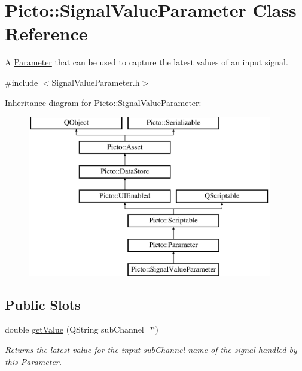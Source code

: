 \hypertarget{class_picto_1_1_signal_value_parameter}{\section{Picto\-:\-:Signal\-Value\-Parameter Class Reference}
\label{class_picto_1_1_signal_value_parameter}
}


A \hyperlink{class_picto_1_1_parameter}{Parameter} that can be used to capture the latest values of an input signal.  




{\ttfamily \#include $<$Signal\-Value\-Parameter.\-h$>$}

Inheritance diagram for Picto\-:\-:Signal\-Value\-Parameter\-:\begin{figure}[H]
\begin{center}
\leavevmode
\includegraphics[height=7.000000cm]{class_picto_1_1_signal_value_parameter}
\end{center}
\end{figure}
\subsection*{Public Slots}
\begin{DoxyCompactItemize}
\item 
\hypertarget{class_picto_1_1_signal_value_parameter_a91b58a4c687a68375c05d6743f211cd5}{double \hyperlink{class_picto_1_1_signal_value_parameter_a91b58a4c687a68375c05d6743f211cd5}{get\-Value} (Q\-String sub\-Channel=\char`\"{}\char`\"{})}\label{class_picto_1_1_signal_value_parameter_a91b58a4c687a68375c05d6743f211cd5}

\begin{DoxyCompactList}\small\item\em Returns the latest value for the input sub\-Channel name of the signal handled by this \hyperlink{class_picto_1_1_parameter}{Parameter}. \end{DoxyCompactList}\end{DoxyCompactItemize}
